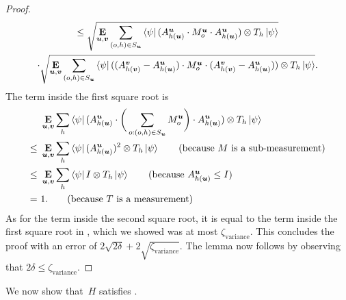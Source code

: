 \begin{proof}
\begin{multline*}
\leq
\sqrt{\mathop{\bf E\/}_{\boldsymbol{u}, \boldsymbol{v}} \sum_{(o, h) \in S_{\boldsymbol{u}}} \bra{\psi} (A^{\boldsymbol{u}}_{h(\boldsymbol{u})} \cdot M^{\boldsymbol{u}}_o \cdot A^{\boldsymbol{u}}_{h(\boldsymbol{u})}) \otimes T_h  \ket{\psi}}\\
\cdot \sqrt{\mathop{\bf E\/}_{\boldsymbol{u}, \boldsymbol{v}} \sum_{(o, h) \in S_{\boldsymbol{u}}} \bra{\psi} ((A^{\boldsymbol{v}}_{h(\boldsymbol{v})} - A^{\boldsymbol{u}}_{h(\boldsymbol{u})}) \cdot M^{\boldsymbol{u}}_o \cdot (A^{\boldsymbol{v}}_{h(\boldsymbol{v})} - A^{\boldsymbol{u}}_{h(\boldsymbol{u})})) \otimes T_h  \ket{\psi}}.
\end{multline*}
The term inside the first square root is
\begin{align*}
&\E_{\bu, \bv} \sum_h \bra{\psi} (A^{\bu}_{h(\bu)} \cdot \bigg(\sum_{o:(o, h) \in S_{\bu}} M^{\bu}_o \bigg)\cdot A^{\bu}_{h(\bu)}) \otimes T_h  \ket{\psi}\\
\leq~&\E_{\bu, \bv} \sum_h \bra{\psi} (A^{\bu}_{h(\bu)})^2 \otimes T_h  \ket{\psi}\tag{because~$M$ is a sub-measurement}\\
\leq~&\E_{\bu, \bv} \sum_h \bra{\psi} I \otimes T_h  \ket{\psi}\tag{because~$A^{\bu}_{h(\bu)} \leq I$}\\
=~&1.\tag{because~$T$ is a measurement}
\end{align*}
As for the term inside the second square root, it is equal to the term inside the first square root in , which we showed was at most $\zeta_{\mathrm{variance}}$.
This concludes the proof with an error of $2\sqrt{2\delta} + 2\sqrt{\zeta_{\mathrm{variance}}}$.
The lemma now follows by observing that $2\delta \leq \zeta_{\mathrm{variance}}$.
\end{proof}

We now show that~$H$ satisfies .



